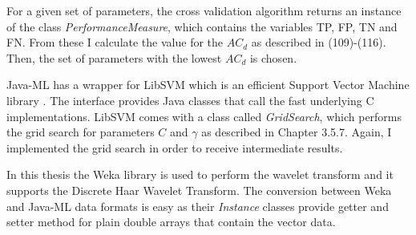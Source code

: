 For a given set of parameters, the cross validation algorithm returns an instance of the class \emph{PerformanceMeasure}, which contains the variables TP, FP, TN and FN. From these I calculate the value for the $AC_d$ as described in (109)-(116). Then, the set of parameters with the lowest $AC_d$ is chosen.

Java-ML has a wrapper for LibSVM which is an efficient Support Vector Machine library \cite{libsvm}. The interface provides Java classes that call the fast underlying C implementations. LibSVM comes with a class called \emph{GridSearch}, which performs the grid search for parameters $C$ and $\gamma$ as described in Chapter 3.5.7. Again, I implemented the grid search in order to receive intermediate results.

In this thesis the Weka library is used to perform the wavelet transform and it supports the Discrete Haar Wavelet Transform. The conversion between Weka and Java-ML data formats is easy as their \emph{Instance} classes provide getter and setter method for plain double arrays that contain the vector data.





